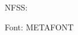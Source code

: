\documentclass{article}
\begin{document}
NFSS: \dbend\ \lhdbend\ \reversedvideodbend\ \textdbend\ \mancube\ \manimpossiblecube\ \manstar

Font: {\manual{}} {\manual METAFONT}
\end{document}
